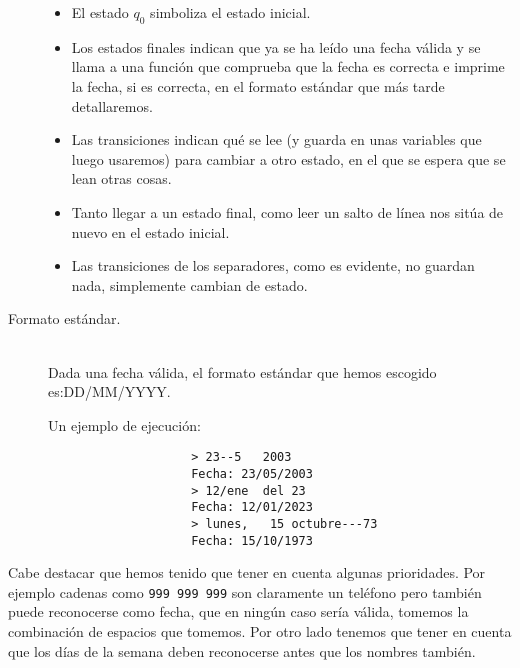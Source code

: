 \documentclass[12pt]{article}
\begin{document}
\begin{description}
\begin{figure}[H]
                \label{fig:diagrama}
            \end{figure}
            \begin{itemize}
                \item El estado $q_0$ simboliza el estado inicial. 
                \item Los estados finales indican que ya se ha leído una fecha válida y se llama a una función que comprueba que la fecha es correcta e imprime la fecha, si es correcta, en el formato estándar que más tarde detallaremos.
                \item Las transiciones indican qué se lee (y guarda en unas variables que luego usaremos) para cambiar a otro estado, en el que se espera que se lean otras cosas. 
                \item Tanto llegar a un estado final, como leer un salto de línea nos sitúa de nuevo en el estado inicial.
                \item Las transiciones de los separadores, como es evidente, no guardan nada, simplemente cambian de estado.
            \end{itemize}

        \item [Formato estándar.]~\\
            Dada una fecha válida, el formato estándar que hemos escogido es:\newline DD/MM/YYYY\@.
            \begin{ejemplo}
                Un ejemplo de ejecución:
                \begin{verbatim}
                    > 23--5   2003
                    Fecha: 23/05/2003
                    > 12/ene  del 23
                    Fecha: 12/01/2023
                    > lunes,   15 octubre---73
                    Fecha: 15/10/1973
                \end{verbatim}

            \end{ejemplo}
            
    \end{description}

    \begin{observacion}
        Cabe destacar que hemos tenido que tener en cuenta algunas prioridades. Por ejemplo cadenas como \verb|999 999 999| son claramente un teléfono pero también puede reconocerse como fecha, que en ningún caso sería válida, tomemos la combinación de espacios que tomemos. Por otro lado tenemos que tener en cuenta que los días de la semana deben reconocerse antes que los nombres también. 
    \end{observacion}
    
\end{document}
